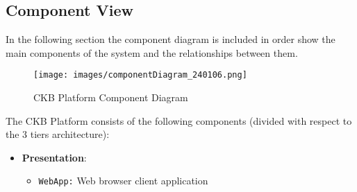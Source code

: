 \documentclass[a4paper, 11pt, titlepage]{article}
\begin{document}
\newpage

\subsection{Component View}
In the following section the component diagram is included in order show the main components of the system and the relationships between them.

\begin{figure}[H]
  \texttt{[image: images/componentDiagram\_240106.png]}
  \caption{CKB Platform Component Diagram}
  \label{fig:CKB_component1}
  \centering
\end{figure}

The CKB Platform consists of the following components (divided with respect to the 3 tiers architecture):
\begin{itemize}
\item \textbf{Presentation}:
\begin{itemize}
  \item \texttt{WebApp:} Web browser client application
\end{itemize}


\end{itemize}
\end{document}
